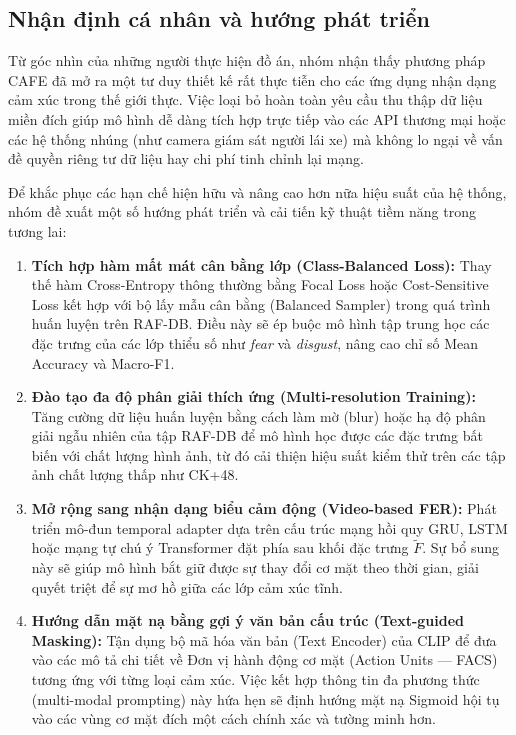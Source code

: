 \subsection{Nhận định cá nhân và hướng phát triển}

Từ góc nhìn của những người thực hiện đồ án, nhóm nhận thấy phương pháp CAFE đã mở ra một tư duy thiết kế rất thực tiễn cho các ứng dụng nhận dạng cảm xúc trong thế giới thực. Việc loại bỏ hoàn toàn yêu cầu thu thập dữ liệu miền đích giúp mô hình dễ dàng tích hợp trực tiếp vào các API thương mại hoặc các hệ thống nhúng (như camera giám sát người lái xe) mà không lo ngại về vấn đề quyền riêng tư dữ liệu hay chi phí tinh chỉnh lại mạng.

Để khắc phục các hạn chế hiện hữu và nâng cao hơn nữa hiệu suất của hệ thống, nhóm đề xuất một số hướng phát triển và cải tiến kỹ thuật tiềm năng trong tương lai:

\begin{enumerate}
    \item \textbf{Tích hợp hàm mất mát cân bằng lớp (Class-Balanced Loss):} Thay thế hàm Cross-Entropy thông thường bằng Focal Loss hoặc Cost-Sensitive Loss kết hợp với bộ lấy mẫu cân bằng (Balanced Sampler) trong quá trình huấn luyện trên RAF-DB. Điều này sẽ ép buộc mô hình tập trung học các đặc trưng của các lớp thiểu số như \textit{fear} và \textit{disgust}, nâng cao chỉ số Mean Accuracy và Macro-F1.
    \item \textbf{Đào tạo đa độ phân giải thích ứng (Multi-resolution Training):} Tăng cường dữ liệu huấn luyện bằng cách làm mờ (blur) hoặc hạ độ phân giải ngẫu nhiên của tập RAF-DB để mô hình học được các đặc trưng bất biến với chất lượng hình ảnh, từ đó cải thiện hiệu suất kiểm thử trên các tập ảnh chất lượng thấp như CK+48.
    \item \textbf{Mở rộng sang nhận dạng biểu cảm động (Video-based FER):} Phát triển mô-đun temporal adapter dựa trên cấu trúc mạng hồi quy GRU, LSTM hoặc mạng tự chú ý Transformer đặt phía sau khối đặc trưng $\tilde{F}$. Sự bổ sung này sẽ giúp mô hình bắt giữ được sự thay đổi cơ mặt theo thời gian, giải quyết triệt để sự mơ hồ giữa các lớp cảm xúc tĩnh.
    \item \textbf{Hướng dẫn mặt nạ bằng gợi ý văn bản cấu trúc (Text-guided Masking):} Tận dụng bộ mã hóa văn bản (Text Encoder) của CLIP để đưa vào các mô tả chi tiết về Đơn vị hành động cơ mặt (Action Units --- FACS) tương ứng với từng loại cảm xúc. Việc kết hợp thông tin đa phương thức (multi-modal prompting) này hứa hẹn sẽ định hướng mặt nạ Sigmoid hội tụ vào các vùng cơ mặt đích một cách chính xác và tường minh hơn.
\end{enumerate}


